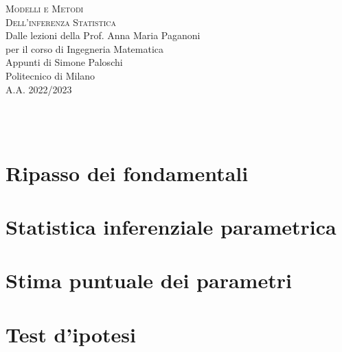 \documentclass{article}
\begin{document}
\begin{center}
	\vspace*{1cm}
	{\Huge \textsc{Modelli e Metodi}}\\
    \vspace*{0.2cm}
    {\Huge\textsc{Dell'inferenza Statistica}}\\
	\vspace*{1cm}
	{\large {Dalle lezioni della Prof. Anna Maria Paganoni}}\\
	\vspace*{0.1cm}
	{\large per il corso di Ingegneria Matematica}\\
	\vspace*{0.7cm}
	{\large {Appunti di Simone Paloschi}}\\
	\vspace*{0.7cm}
	Politecnico di Milano\\
	A.A. 2022/2023
\end{center}
\phantom{}\\ \\

\begingroup
  \hypersetup{hidelinks}
  \tableofcontents
\endgroup


\pagebreak







\section{Ripasso dei fondamentali}



\newpage

\section{Statistica inferenziale parametrica}



\newpage

\section{Stima puntuale dei parametri}



\newpage

\section{Test d'ipotesi}
\end{document}
